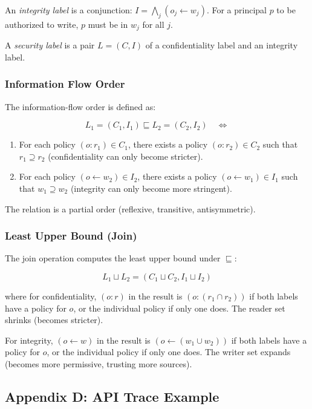 An \emph{integrity label} is a conjunction: $I = \bigwedge_j (o_j \leftarrow w_j)$. For a principal $p$ to be authorized to write, $p$ must be in $w_j$ for all $j$.

A \emph{security label} is a pair $L = (C, I)$ of a confidentiality label and an integrity label.

\subsubsection*{Information Flow Order}

The information-flow order is defined as:

\[
L_1=(C_1,I_1) \sqsubseteq L_2=(C_2,I_2) \quad \Leftrightarrow
\]

\begin{enumerate}
\item For each policy $(o:r_1) \in C_1$, there exists a policy $(o:r_2) \in C_2$ such that $r_1 \supseteq r_2$ (confidentiality can only become stricter).

\item For each policy $(o \leftarrow w_2) \in I_2$, there exists a policy $(o \leftarrow w_1) \in I_1$ such that $w_1 \supseteq w_2$ (integrity can only become more stringent).
\end{enumerate}

The relation is a partial order (reflexive, transitive, antisymmetric).

\subsubsection*{Least Upper Bound (Join)}

The join operation computes the least upper bound under $\sqsubseteq$:

\[
L_1 \sqcup L_2 = (C_1 \sqcup C_2, I_1 \sqcup I_2)
\]

where for confidentiality, $(o:r)$ in the result is $(o:(r_1 \cap r_2))$ if both labels have a policy for $o$, or the individual policy if only one does. The reader set shrinks (becomes stricter).

For integrity, $(o \leftarrow w)$ in the result is $(o \leftarrow (w_1 \cup w_2))$ if both labels have a policy for $o$, or the individual policy if only one does. The writer set expands (becomes more permissive, trusting more sources).

\subsection{Appendix D: API Trace Example}

